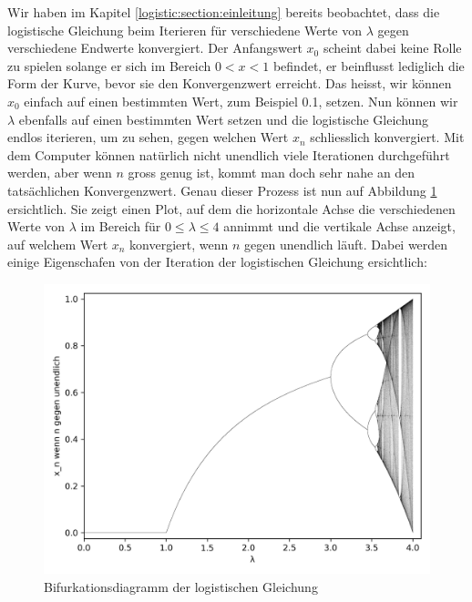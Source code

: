 Wir haben im Kapitel 
\ref{logistic:section:einleitung} 
bereits beobachtet, 
dass die logistische Gleichung beim Iterieren für 
verschiedene Werte von $\lambda$ gegen verschiedene 
Endwerte konvergiert. 
Der Anfangswert $x_0$ scheint dabei keine Rolle zu spielen
solange er sich im Bereich $0 < x < 1$ befindet, 
er beinflusst lediglich die Form der Kurve, 
bevor sie den Konvergenzwert erreicht. 
Das heisst, wir können $x_0$ einfach auf einen bestimmten Wert, 
zum Beispiel 0.1, setzen. 
Nun können wir $\lambda$ ebenfalls auf einen bestimmten Wert setzen
und die logistische Gleichung endlos iterieren, 
um zu sehen, gegen welchen Wert $x_n$ schliesslich konvergiert.
Mit dem Computer können natürlich nicht unendlich viele Iterationen
durchgeführt werden, aber wenn $n$ gross genug ist, 
kommt man doch sehr nahe an den tatsächlichen Konvergenzwert. 
Genau dieser Prozess ist nun auf Abbildung \ref{fig:map_1} 
ersichtlich. 
Sie zeigt einen Plot, 
auf dem die horizontale Achse die verschiedenen Werte
von $\lambda$ im Bereich für $0 \leq \lambda \leq 4$ annimmt 
und die vertikale Achse anzeigt,
auf welchem Wert $x_n$ konvergiert, wenn $n$ gegen
unendlich läuft. Dabei werden einige Eigenschafen 
von der Iteration der logistischen Gleichung ersichtlich:
\begin{figure}
    \includegraphics[width=\linewidth]{papers/logistic/figures/map.png}
    \caption{Bifurkationsdiagramm der logistischen Gleichung}
    \label{fig:map_1}
\end{figure}
